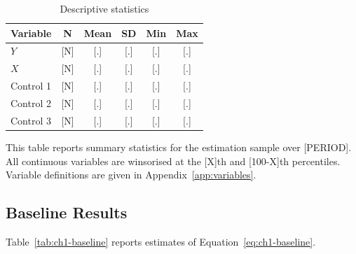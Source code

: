 \documentclass[../main.tex]{subfiles}
\begin{document}
%
%
\begin{table}[p]
    \centering
    \caption{Descriptive statistics}
    \label{tab:ch1-descriptive}
    \begin{tabular}{lccccc}
        \toprule
        Variable & N & Mean & SD & Min & Max \\
        \midrule
        $Y$          & [N] & [.] & [.] & [.] & [.] \\
        $X$          & [N] & [.] & [.] & [.] & [.] \\
        Control 1    & [N] & [.] & [.] & [.] & [.] \\
        Control 2    & [N] & [.] & [.] & [.] & [.] \\
        Control 3    & [N] & [.] & [.] & [.] & [.] \\
        \bottomrule
    \end{tabular}

    \vspace{1mm}
    {\footnotesize
    This table reports summary statistics for the estimation sample over
    [PERIOD]. All continuous variables are winsorised at the
    [X]th and [100-X]th percentiles. Variable definitions are given in
    Appendix~\ref{app:variables}.
    }
\end{table}

\subsection{Baseline Results}

Table~\ref{tab:ch1-baseline} reports estimates of
Equation~\eqref{eq:ch1-baseline}.
\end{document}
